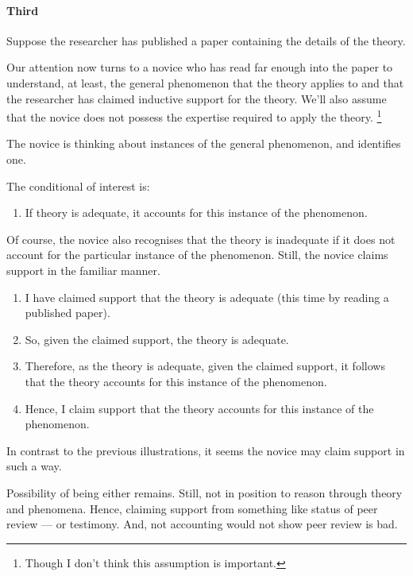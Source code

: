 \paragraph{Third}

\begin{note}
  \begin{illustration}\label{ill:CE:testimony}
    Suppose the researcher has published a paper containing the details of the theory.

    Our attention now turns to a novice who has read far enough into the paper to understand, at least, the general phenomenon that the theory applies to and that the researcher has claimed inductive support for the theory.
    We'll also assume that the novice does not possess the expertise required to apply the theory.\nolinebreak
    \footnote{
      Though I don't think this assumption is important.
    }

    The novice is thinking about instances of the general phenomenon, and identifies one.

    The conditional of interest is:
    \begin{enumerate}
    \item If theory is adequate, it accounts for this instance of the phenomenon.
    \end{enumerate}

    Of course, the novice also recognises that the theory is inadequate if it  does not account for the particular instance of the phenomenon.
    Still, the novice claims support in the familiar manner.

    \begin{enumerate}
    \item I have claimed support that the theory is adequate (this time by reading a published paper).
    \item So, given the claimed support, the theory is adequate.
    \item Therefore, as the theory is adequate, given the claimed support, it follows that the theory accounts for this instance of the phenomenon.
    \item Hence, I claim support that the theory accounts for this instance of the phenomenon.
    \end{enumerate}
    \vspace{-\baselineskip}
  \end{illustration}

  In contrast to the previous illustrations, it seems the novice may claim support in such a way.

  Possibility of being either \mom{} remains.
  Still, not in position to reason through theory and phenomena.
  Hence, claiming support from something like status of peer review --- or testimony.
  And, not accounting would not show peer review is bad.
\end{note}

